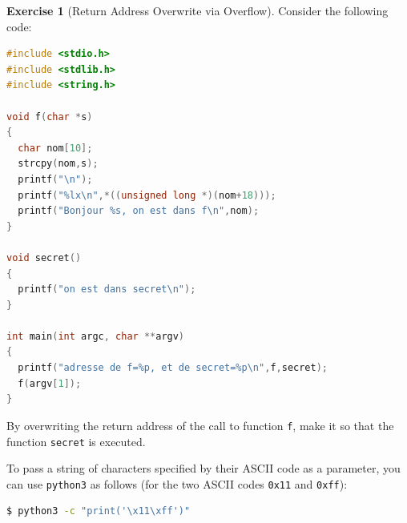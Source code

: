 \documentclass[a4paper,11pt]{article}
\theoremstyle{plain}
\theoremstyle{definition}
\newtheorem{exercice}{Exercise}
\begin{document}

\begin{exercice}[Return Address Overwrite via Overflow]
Consider the following code:
\begin{lstlisting}[language=C]
#include <stdio.h>
#include <stdlib.h>
#include <string.h>

void f(char *s)
{
  char nom[10];
  strcpy(nom,s);
  printf("\n");
  printf("%lx\n",*((unsigned long *)(nom+18)));
  printf("Bonjour %s, on est dans f\n",nom);
}

void secret()
{
  printf("on est dans secret\n");
}

int main(int argc, char **argv)
{
  printf("adresse de f=%p, et de secret=%p\n",f,secret);
  f(argv[1]);
}
\end{lstlisting}
By overwriting the return address of the call to function \texttt{f}, make it so that the function \texttt{secret} is executed.

\begin{attention}
To pass a string of characters specified by their ASCII code as a parameter, you can use \texttt{python3} as follows (for the two ASCII codes \texttt{0x11} and \texttt{0xff}):
\begin{lstlisting}[language=bash,numbers=none]
$ python3 -c "print('\x11\xff')"
\end{lstlisting}
\end{attention}
\end{exercice}


\end{document}
